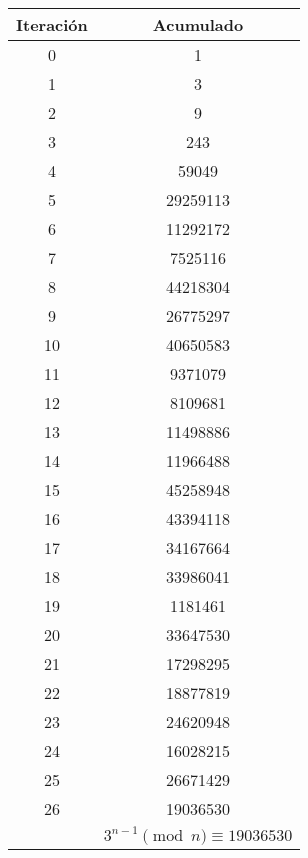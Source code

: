 \documentclass[fleqn]{article}
\begin{document}
        \begin{tabular}{c | c}
            Iteración & Acumulado \\ \hline
            0 & 1 \\
            1 & 3   \\
            2 & 9   \\
            3 & 243     \\
            4 & 59049   \\
            5 & 29259113    \\
            6 & 11292172    \\
            7 & 7525116     \\
            8 & 44218304    \\
            9 & 26775297    \\
           10 & 40650583    \\
           11 & 9371079     \\
           12 & 8109681     \\
           13 & 11498886    \\
           14 & 11966488    \\
           15 & 45258948    \\
           16 & 43394118    \\
           17 & 34167664    \\
           18 & 33986041    \\
           19 & 1181461     \\
           20 & 33647530    \\
           21 & 17298295    \\
           22 & 18877819    \\
           23 & 24620948    \\
           24 & 16028215    \\
           25 & 26671429    \\
           26 & 19036530    \\ \hline
           & $ 3^{n-1} \pmod{n} \equiv 19036530 $
        \end{tabular}
\end{document}

